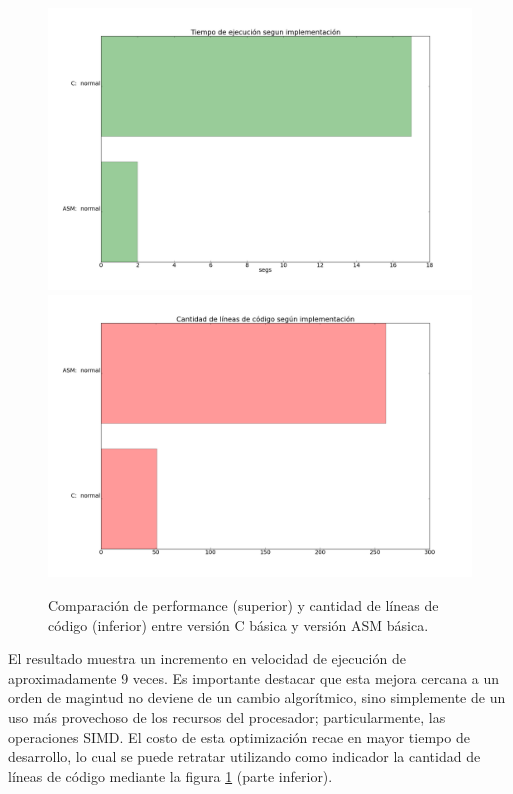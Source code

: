 \begin{figure}[H]
\begin{center}
  \includegraphics[scale=0.35]{secciones/filtro_color/graficos/C_ASM_perf.png}
  \includegraphics[scale=0.35]{secciones/filtro_color/graficos/C_ASM_loc.png}
\end{center}
\caption{Comparación de performance (superior) y cantidad de líneas de código (inferior) entre versión C básica y versión ASM básica.}
\label{fig:filtro-color-C-vs-ASM}
\end{figure}

El resultado muestra un incremento en velocidad de ejecución de aproximadamente 9 veces. Es importante destacar que esta mejora cercana a un orden de magintud no deviene de un cambio algorítmico, sino simplemente de un uso más provechoso de los recursos del procesador; particularmente, las operaciones SIMD. El costo de esta optimización recae en mayor tiempo de desarrollo, lo cual se puede retratar utilizando como indicador la cantidad de líneas de código mediante la figura \ref{fig:filtro-color-C-vs-ASM} (parte inferior).


